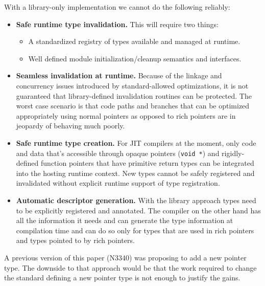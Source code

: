 With a library-only implementation we cannot do the following reliably:

\begin{itemize}

  \item \textbf{Safe runtime type invalidation.} This will require two things:

  \begin{itemize}

   \item A standardized registry of types available and managed at runtime.

   \item Well defined module initialization/cleanup semantics and interfaces.

  \end{itemize}

  \item \textbf{Seamless invalidation at runtime.} Because of the linkage and
  concurrency issues introduced by standard-allowed optimizations, it is not
  guaranteed that library-defined invalidation routines can be protected. The
  worst case scenario is that code paths and branches that can be optimized
  appropriately using normal pointers as opposed to rich pointers are in
  jeopardy of behaving much poorly.

  \item \textbf{Safe runtime type creation.} For JIT compilers at the moment,
  only code and data that’s accessible through opaque pointers (\verb+void *+)
  and rigidly-defined function pointers that have primitive return types can
  be integrated into the hosting runtime context. New types cannot be safely
  registered and invalidated without explicit runtime support of type
  registration.

  \item \textbf{Automatic descriptor generation.} With the library approach
  types need to be explicitly registered and annotated. The compiler on the
  other hand has all the information it needs and can generate the type
  information at compilation time and can do so only for types that are used
  in rich pointers and types pointed to by rich pointers.

\end{itemize}

A previous version of this paper (N3340) was proposing to add a new pointer type. The downside to that approach would be that the work required to change the standard defining a new pointer type is not enough to justify the gains.

